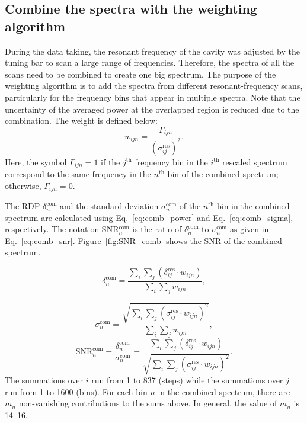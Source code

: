 \documentclass[%
reprint, %
superscriptaddress,
 amsmath,amssymb,
 aps
]{revtex4-2}
\begin{document}
\subsection{Combine the spectra with the weighting algorithm} 
\label{sec:weighting_algorithm}
During the data taking, the resonant frequency of the cavity was  
adjusted by the tuning bar to scan a large range of frequencies.  
Therefore, the spectra of all the scans need to be combined to create one 
big spectrum. 
The purpose of the weighting algorithm is to add the spectra from different 
resonant-frequency scans,
 particularly for the frequency bins that appear in multiple spectra. 
Note that the uncertainty of the averaged power at the overlapped region is 
reduced due to the combination.  
The weight is defined below: 
\begin{equation}
    \label{eq:weight}
    {w_{ijn}} = \frac{\Gamma_{ijn}}{(\sigma_{ij}^\text{res})^{2}}.
\end{equation}
Here, the symbol $\Gamma_{ijn}=1$ if the $j^\text{th}$ frequency bin in the 
$i^\text{th}$ rescaled spectrum correspond to the same frequency in 
the $n^\text{th}$ bin of the combined spectrum; otherwise, $\Gamma_{ijn}=0$.

The RDP $\delta^\text{com}_{n}$ and the standard deviation 
$\sigma^\text{com}_{n}$ of the $n^\text{th}$ bin in the combined spectrum are 
calculated using Eq.~\eqref{eq:comb_power} and Eq.~\eqref{eq:comb_sigma}, 
respectively. The notation SNR$^\text{com}_{n}$ is the ratio of 
$\delta^\text{com}_{n}$ to 
$\sigma^\text{com}_{n}$ as given in Eq.~\eqref{eq:comb_snr}. 
Figure~\ref{fig:SNR_comb} shows the SNR of the combined spectrum. 

\begin{equation}
    \label{eq:comb_power}
    \delta_{n}^\text{com} = \frac{\sum\limits_{i}\sum\limits_{j}\left(\delta_{ij}^\text{res} \cdot {w_{ijn}}\right)}{\sum\limits_{i}\sum\limits_{j} {w_{ijn}}},
\end{equation}

\begin{equation}
    \label{eq:comb_sigma}
    \sigma_{n}^\text{com} = \frac{ \sqrt{\sum\limits_{i}\sum\limits_{j}(\sigma_{ij}^\text{res} \cdot {w_{ijn}})^2}}{\sum\limits_{i}\sum\limits_{j} {w_{ijn}}},
\end{equation}
\begin{equation}
    \label{eq:comb_snr}
    \text{SNR}_{n}^\text{com} = \frac{\delta^\text{com}_{n}}{\sigma^\text{com}_{n}}= \frac{\sum\limits_{i}\sum\limits_{j}\left(\delta_{ij}^\text{res} \cdot {w_{ijn}}\right)}{ \sqrt{\sum\limits_{i}\sum\limits_{j}(\sigma_{ij}^\text{res} \cdot {w_{ijn}})^2}}.
\end{equation} 
The summations over $i$ run from 1 to 837 (steps) while the summations 
over $j$ run from 1 to 1600 (bins).  
For each bin $n$ in the combined spectrum, there are $m_n$ non-vanishing 
contributions to the sums above. In general, the value of $m_n$ is 14--16.
\end{document}
